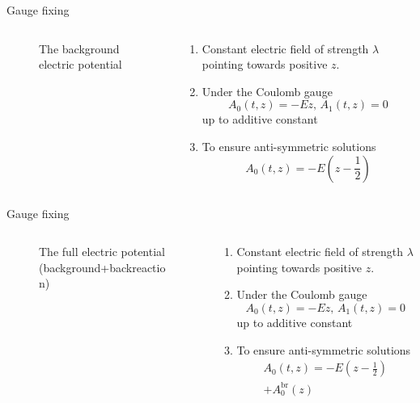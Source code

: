 \begin{frame}{Gauge fixing}
	\begin{columns}
	    \begin{column}{0.5\textwidth}
\begin{figure}[ht]
    \centering
    \caption{The background electric potential}
    \label{fig:the-background-classical-electric-field}
\end{figure}
	    \end{column}
	    \begin{column}{0.5\textwidth}
		    \begin{enumerate}[<+->]
		    	\item 
	    Constant electric field of strength $\lambda$ pointing towards positive $z.$
    \item Under the Coulomb gauge $$A_0(t, z) = -E z,\, A_1(t, z) = 0$$ up to additive constant
    \item To ensure anti-symmetric solutions $$A_0(t, z)=-E(z-\frac{1}{2})$$

		    \end{enumerate}
	    \end{column}
	\end{columns}

\end{frame}
\begin{frame}{Gauge fixing}

	\begin{columns}
	    \begin{column}{0.5\textwidth}
\begin{figure}[ht]
    \centering
    \caption{The full electric potential (background+backreaction)}
    \label{fig:the-background-classical-electric-field}
\end{figure}
	    \end{column}
	    \begin{column}{0.5\textwidth}
		    \begin{enumerate}
		    	\item 
	    Constant electric field of strength $\lambda$ pointing towards positive $z.$
    \item Under the Coulomb gauge $$A_0(t, z) = -E z,\, A_1(t, z) = 0$$ up to additive constant
    \item To ensure anti-symmetric solutions 
	    \begin{align*}
	    	A_0(t, z)=-E(z-\frac{1}{2}) \\ + A_0^{\text{br}}(z)
	    \end{align*}

		    \end{enumerate}
	    \end{column}
	\end{columns}

\end{frame}

